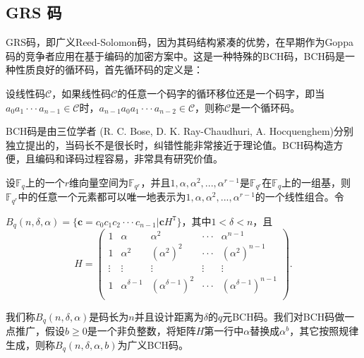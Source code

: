 \subsection{GRS 码}
GRS码，即广义Reed-Solomon码，因为其码结构紧凑的优势，在早期作为Goppa码的竞争者应用在基于编码的加密方案中。这是一种特殊的BCH码，BCH码是一种性质良好的循环码，首先循环码的定义是：

\begin{define}[循环码]
	设线性码$\mathcal{C}$，如果线性码$\mathcal{C}$的任意一个码字的循环移位还是一个码字，即当$a_0a_1···a_{n-1} \in \mathcal{C}$时，$a_{n-1}a_0a_1···a_{n-2} \in \mathcal{C}$，则称$\mathcal{C}$是一个循环码。
\end{define}

BCH码是由三位学者 (R. C. Bose, D. K. Ray-Chaudhuri, A. Hocquenghem)分别独立提出的，当码长不是很长时，纠错性能非常接近于理论值。BCH码构造方便，且编码和译码过程容易，非常具有研究价值。

\begin{define}[BCH码]
	设$\mathbb{F}_q$上的一个$r$维向量空间为$\mathbb{F}_{q^r}$，并且$1, \alpha, \alpha ^ 2, ... , \alpha ^ {r - 1}$是$\mathbb{F}_{q^r}$在$\mathbb{F}_q$上的一组基，则$\mathbb{F}_{q^r}$中的任意一个元素都可以唯一地表示为$1, \alpha, \alpha ^ 2, ... , \alpha ^ {r - 1}$的一个线性组合。令
	
	\centering $B_q(n, \delta, \alpha)=\{\mathbf{c}=c_0c_1c_2···c_{n-1} | \mathbf{c}H^\mathtt{T}\}$，其中$1 < \delta < n$，且
	\begin{equation}       %
	H =
	\left(                 %
	\begin{array}{ccccc}   %
	1 & \alpha & \alpha^2 & ··· & \alpha^{n-1}\\  %
    1 & \alpha^2 & (\alpha^2)^2 & ··· & (\alpha^2)^{n-1}\\  %
    \vdots & \vdots & \vdots & \vdots & \vdots \\
    1 & \alpha^{\delta - 1} & (\alpha^{\delta - 1})^2 & ··· & (\alpha^{\delta - 1})^{n-1}\\
	\end{array}
	\right).                 %
	\end{equation}
	\begin{flushleft}
        我们称$B_q(n, \delta, \alpha)$是码长为$n$并且设计距离为$\delta$的$q$元BCH码。我们对BCH码做一点推广，假设$b \geq 0$是一个非负整数，将矩阵$H$第一行中$\alpha$替换成$\alpha ^ b$，其它按照规律生成，则称$B_q(n, \delta, \alpha, b)$为广义BCH码。
	\end{flushleft}	
\end{define}

